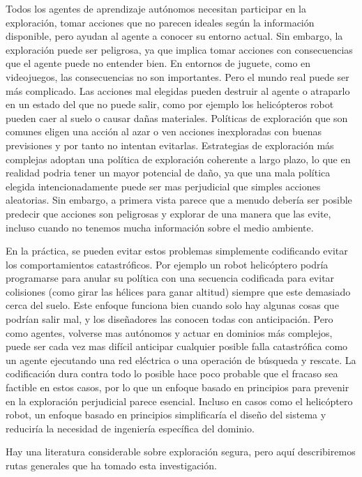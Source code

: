 \documentclass[12pt,a4paper]{article}
\begin{document}
Todos los agentes de aprendizaje autónomos necesitan participar en la exploración, tomar acciones que no parecen ideales según la información disponible, pero ayudan al agente a conocer su entorno actual. Sin embargo, la exploración puede ser peligrosa, ya que implica tomar acciones con consecuencias que el agente puede no entender bien. En entornos de juguete, como en videojuegos, las consecuencias no son importantes. Pero el mundo real puede ser más complicado. Las acciones mal elegidas pueden destruir al agente o atraparlo en un estado del que no puede salir, como por ejemplo los helicópteros robot pueden caer al suelo o causar dañas materiales. Políticas de exploración que son comunes eligen una acción al azar o ven acciones inexploradas con buenas previsiones y por tanto no intentan evitarlas. Estrategias de exploración más complejas adoptan una política de exploración coherente a largo plazo, lo que en realidad podria tener un mayor potencial de daño, ya que una mala política elegida intencionadamente puede ser mas perjudicial que simples acciones aleatorias. Sin embargo, a primera vista parece que a menudo debería ser posible predecir que acciones son peligrosas y explorar de una manera que las evite, incluso cuando no tenemos mucha información sobre el medio ambiente.

En la práctica, se pueden evitar estos problemas simplemente codificando evitar los comportamientos catastróficos. Por ejemplo un robot helicóptero podría programarse para anular su política con una secuencia codificada para evitar colisiones (como girar las hélices para ganar altitud) siempre que este demasiado cerca del suelo. Este enfoque funciona bien cuando solo hay algunas cosas que podrían salir mal, y los diseñadores las conocen todas con anticipación. Pero como agentes, volverse mas autónomos y actuar en dominios más complejos, puede ser cada vez mas difícil anticipar cualquier posible falla catastrófica como un agente ejecutando una red eléctrica o una operación de búsqueda y rescate. La codificación dura contra todo lo posible hace poco probable que el fracaso sea factible en estos casos, por lo que un enfoque basado en principios para prevenir en la exploración perjudicial parece esencial. Incluso en casos como el helicóptero robot, un enfoque basado en principios simplificaría el diseño del sistema y reduciría la necesidad de ingeniería específica del dominio.

Hay una literatura considerable sobre exploración segura, pero aquí describiremos rutas generales que ha tomado esta investigación.
\end{document}
